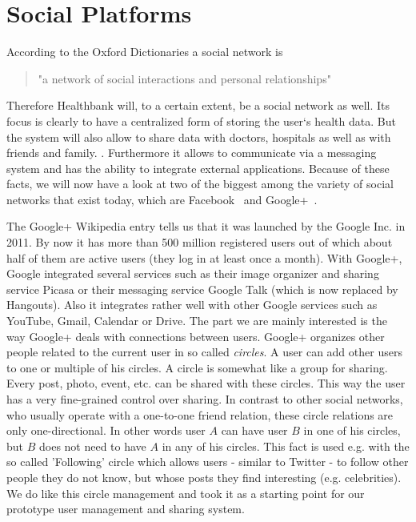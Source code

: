 \section{Social Platforms}
According to the Oxford Dictionaries a social network is 
\begin{quote}
"a network of social interactions and personal relationships"
\end{quote}
Therefore Healthbank will, to a certain extent, be a social network as well. Its focus is clearly to have a centralized form of storing the user`s health data. But the system will also allow to share data with doctors, hospitals as well as with friends and family. . Furthermore it allows to communicate via a messaging system and has the ability to integrate external applications. Because of these facts, we will now have a look at two of the biggest among the variety of social networks that exist today, which are Facebook~\cite{facebook} and Google+~\cite{googlePlus}.

The Google+ Wikipedia entry tells us that it was launched by the Google Inc. in 2011. By now it has more than 500 million registered users out of which about half of them are active users (they log in at least once a month). With Google+, Google integrated several services such as their image organizer and sharing service Picasa or their messaging service Google Talk (which is now replaced by Hangouts). Also it integrates rather well with other Google services such as YouTube, Gmail, Calendar or Drive.\newline 
The part we are mainly interested is the way Google+ deals with connections between users. Google+ organizes other people related to the current user in so called \emph{circles}. A user can add other users to one or multiple of his circles. A circle is somewhat like a group for sharing. Every post, photo, event, etc. can be shared with these circles. This way the user has a very fine-grained control over sharing. In contrast to other social networks, who usually operate with a one-to-one friend relation, these circle relations are only one-directional. In other words user $A$ can have user $B$ in one of his circles, but $B$ does not need to have $A$ in any of his circles. This fact is used e.g. with the so called 'Following' circle which allows users - similar to Twitter - to follow other people they do not know, but whose posts they find interesting (e.g. celebrities). We do like this circle management and took it as a starting point for our prototype user management and sharing system.

